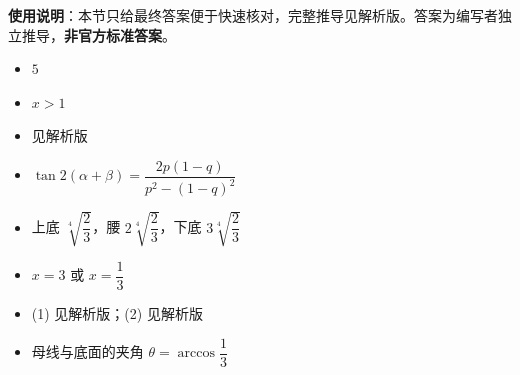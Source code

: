 
\begin{gknotice}
\textbf{使用说明}：本节只给最终答案便于快速核对，完整推导见解析版。答案为编写者独立推导，\textbf{非官方标准答案}。
\end{gknotice}

\begin{itemize}[leftmargin=2.6em]
  \item[\textbf{1.}] $5$
  \item[\textbf{2.}] $x>1$
  \item[\textbf{3.}] 见解析版
  \item[\textbf{4.}] $\tan 2(\alpha+\beta)=\dfrac{2p(1-q)}{p^2-(1-q)^2}$
  \item[\textbf{5.}] 上底 $\sqrt[4]{\dfrac23}$，腰 $2\sqrt[4]{\dfrac23}$，下底 $3\sqrt[4]{\dfrac23}$
  \item[\textbf{6.}] $x=3$ 或 $x=\dfrac13$
  \item[\textbf{7.}] (1) 见解析版；(2) 见解析版
  \item[\textbf{8.}] 母线与底面的夹角 $\theta=\arccos\dfrac13$
\end{itemize}
